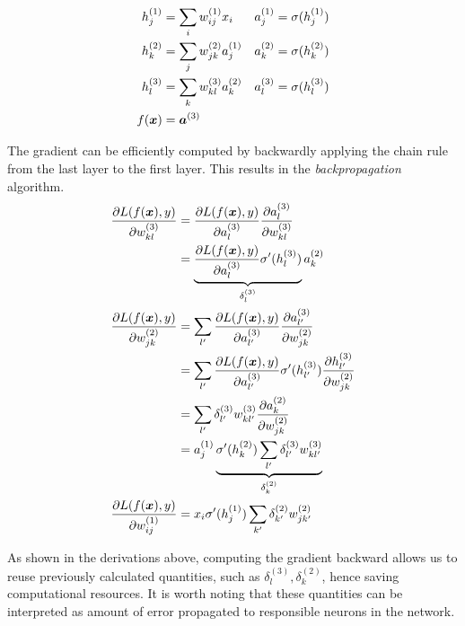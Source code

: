 \begin{align*}
		h_j^{(1)} &= \sum_i w_{ij}^{(1)} x_i & a_j^{(1)} &= \sigma (h_j^{(1)})	\\
		h_k^{(2)} &= \sum_j w_{jk}^{(2)} a_j^{(1)}  & a_k^{(2)} &= \sigma (h_k^{(2)})	 \\
		h_l^{(3)} &= \sum_k w_{kl}^{(3)} a_k^{(2)} & a_l^{(3)} &= \sigma (h_l^{(3)})	 \\
		f(\boldsymbol{x}) &= \boldsymbol{a}^{(3)}
\end{align*}


The gradient can be efficiently computed by backwardly applying the chain rule from the last layer to the first layer. This results in the \textit{backpropagation} algorithm.
\begin{align*}
	\frac{\partial L(f(\boldsymbol{x}), y)  }{\partial w_{k  l}^{(3)} } &= 	\frac{\partial L(f(\boldsymbol{x}), y) }{\partial a_{l}^{(3)} }  \frac{\partial a_{l}^{(3)} }{\partial w_{k  l}^{(3)} }  	\\
		&= 	\underbrace{\frac{\partial L(f(\boldsymbol{x}), y) }{\partial a_{l}^{(3)} } \sigma'(h_l^{(3)})}_{ \delta_l^{(3)}} a_{k}^{(2)} 	\\
	\frac{\partial L(f(\boldsymbol{x}), y)  }{\partial w_{j  k}^{(2)} } 
		&=  \sum_{l'} 	\frac{\partial L(f(\boldsymbol{x}), y) }{\partial a_{l'}^{(3)} } \frac{\partial a_{l'}^{(3)}}{\partial w_{j  k}^{(2)}} \\
		&= \sum_{l'} 	\frac{\partial L(f(\boldsymbol{x}), y) }{\partial a_{l'}^{(3)} } \sigma'(h_{l'}^{(3)})  \frac{\partial h_{l'}^{(3)} }{\partial w_{j  k}^{(2)}} \\
		&= \sum_{l'} 	\delta_{l'}^{(3)}  w_{k  l'}^{(3)} \frac{\partial a_{k}^{(2)} }{\partial w_{j  k}^{(2)}} \\
		&= a_{j}^{(1)}  \underbrace{\sigma'(h_{k}^{(2)}) \sum_{l'}\delta_{l'}^{(3)} w_{k  l'}^{(3)}}_{\delta_{k}^{(2)}}  \\
	\frac{\partial L(f(\boldsymbol{x}), y)  }{\partial w_{i  j}^{(1)} } &=  x_i  \sigma'(h_{j}^{(1)}) \sum_{k'} 	\delta_{k'}^{(2)} w_{j  k'}^{(2)} 
\end{align*}

As shown in the derivations above, computing the gradient backward allows us to reuse previously calculated quantities, such as $\delta_l^{(3)}, \delta_{k}^{(2)}$, hence saving computational resources.  It is worth noting that these  quantities can be interpreted as amount of error propagated to responsible neurons in the network.


